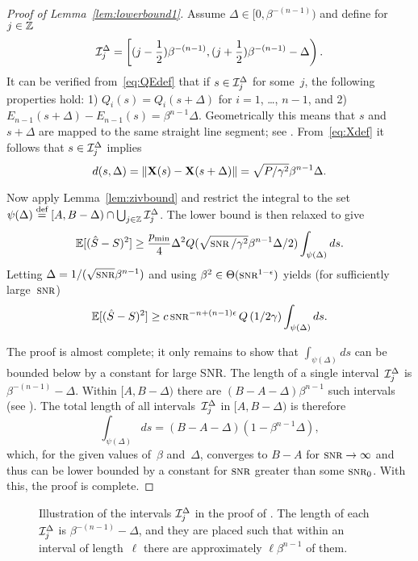 \begin{proof}[Proof of Lemma~\ref{lem:lowerbound1}]
  Assume $\Delta \in [0, \beta^{-(n-1)})$ and define for $j \in \mathbb{Z}$
  \[ \mathcal{I}_j^\Delta = \left[ (j - \frac12 )\beta^{-(n-1)}, 
    (j + \frac12 ) \beta^{-(n-1)} - \Delta \right).\]
  It can be verified from~\eqref{eq:QEdef} that if $s \in \mathcal{I}_j^\Delta$ for
  some~$j$, the following properties hold: 1) $Q_i(s) = Q_i(s+\Delta)$ for
  $i=1$, \dots, $n-1$, and 2) $E_{n-1}(s+\Delta) - E_{n-1}(s) =
  \beta^{n-1}\Delta$. Geometrically this means that $s$ and~$s + \Delta$ are
  mapped to the same straight line segment; see .
  From~\eqref{eq:Xdef} it follows that $s \in \mathcal{I}_j^\Delta$ implies
  \begin{equation*}
    d(s, \Delta) = \|\mathbf{X}(s) - \mathbf{X}(s+\Delta)\| = \sqrt{P/\gamma^2}
    \beta^{n-1}\Delta.
  \end{equation*}

  Now apply Lemma~\ref{lem:zivbound} and restrict the integral to the
  set~$\psi(\Delta) \stackrel{\text{def}}{=} [A,B-\Delta) \cap \bigcup_{j\in\mathbb{Z}} \mathcal{I}_j^\Delta$. The
  lower bound is then relaxed to give
  \begin{equation*}
    \mse \ge \frac{\pmin}{4} \Delta^2 Q(\sqrt{\snr/\gamma^2} \beta^{n-1}
    \Delta/2) \int_{\psi(\Delta)} ds.
  \end{equation*}
  Letting $\Delta = 1/(\sqrt{\snr}\beta^{n-1})$ and using $\beta^2 \in
  \Theta(\snr^{1-\e})$ yields (for sufficiently large~$\snr$)
  \begin{equation*}
    \mse \ge c \snr^{-n+(n-1)\e} Q\left(1/2\gamma\right)
    \int_{\psi(\Delta)} ds.
  \end{equation*}

  The proof is almost complete; it only remains to show that
  $\int_{\psi(\Delta)}ds$ can be bounded below by a constant for large SNR. The
  length of a single interval~$\mathcal{I}_j^\Delta$ is $\beta^{-(n-1)} - \Delta$. Within
  $[A,B-\Delta)$ there are $(B-A-\Delta)\beta^{n-1}$ such intervals (see
  ). The total
  length of all intervals~$\mathcal{I}_j^\Delta$ in $[A, B-\Delta)$ is therefore
  \[ \int_{\psi(\Delta)} ds = (B-A-\Delta)
  (1 - \beta^{n-1}\Delta), \]
  which, for the given values of~$\beta$ and~$\Delta$, 
  converges to $B-A$ for $\snr \ra \infty$ and thus can be lower bounded by a
  constant for $\snr$ greater than some $\snr_0$. With this, the proof is
  complete.
\end{proof}

\begin{figure}
  \begin{center}
    
  \end{center}
  \caption{Illustration of the intervals $\mathcal{I}_j^\Delta$ in the proof of
  . The length of each $\mathcal{I}_j^\Delta$ is $\beta^{-(n-1)} -
  \Delta$, and they are placed such that within an interval of length~$\ell$
  there are approximately $\ell \beta^{n-1}$ of them.}
  \label{fig:lowerbound1intervals}
\end{figure}


